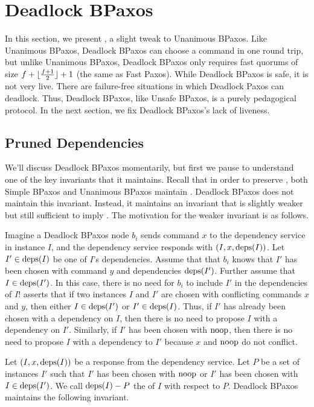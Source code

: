 \section{Deadlock BPaxos}
In this section, we present , a slight tweak to
Unanimous BPaxos. Like Unanimous BPaxos, Deadlock BPaxos can choose a command
in one round trip, but unlike Unanimous BPaxos, Deadlock BPaxos only requires
fast quorums of size $f + \lfloor\frac{f + 1}{2}\rfloor + 1$ (the same as Fast Paxos).
%
While Deadlock BPaxos is safe, it is not very live. There are failure-free
situations in which Deadlock Paxos can deadlock. Thus, Deadlock BPaxos, like
Unsafe BPaxos, is a purely pedagogical protocol. In the next section, we fix
Deadlock BPaxos's lack of liveness.

\subsection{Pruned Dependencies}
We'll discuss Deadlock BPaxos momentarily, but first we pause to understand one
of the key invariants that it maintains. Recall that in order to preserve
, both Simple BPaxos and Unanimous BPaxos maintain
.
%
Deadlock BPaxos does not maintain this invariant. Instead, it maintains an
invariant that is slightly weaker but still sufficient to imply
. The motivation for the weaker invariant is as
follows.

Imagine a Deadlock BPaxos node $b_i$ sends command $x$ to the dependency
service in instance $I$, and the dependency service responds with $(I, x,
\text{deps}(I))$. Let $I' \in \text{deps}(I)$ be one of $I$'s dependencies. Assume that
that $b_i$ knows that $I'$ has been chosen with command $y$ and dependencies
$\text{deps}(I')$. Further assume that $I \in \text{deps}(I')$. In this case, there is no
need for $b_i$ to include $I'$ in the dependencies of $I$!
 asserts that if two instances $I$ and $I'$ are
chosen with conflicting commands $x$ and $y$, then either $I \in \text{deps}(I')$ or
$I' \in \text{deps}(I)$. Thus, if $I'$ has already been chosen with a dependency on
$I$, then there is no need to propose $I$ with a dependency on $I'$.
%
Similarly, if $I'$ has been chosen with $\text{noop}$, then there is no need to
propose $I$ with a dependency to $I'$ because $x$ and $\text{noop}$ do not conflict.

Let $(I, x, \text{deps}(I))$ be a response from the dependency service. Let $P$ be a
set of instances $I'$ such that $I'$ has been chosen with $\text{noop}$ or $I'$ has
been chosen with $I \in \text{deps}(I')$. We call $\text{deps}(I) - P$ the  of $I$ with respect to $P$. Deadlock BPaxos maintains the
following invariant.

